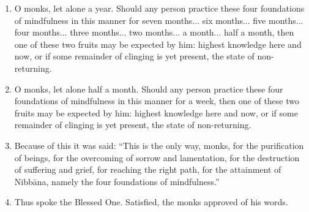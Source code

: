 \begin{enumerate}[resume]
\item O monks, let alone a year. Should any person practice these four foundations of mindfulness in this manner for seven months... six months... five months... four months... three months... two months... a month... half a month, then one of these two fruits may be expected by him: highest knowledge here and now, or if some remainder of clinging is yet present, the state of non-returning.
\item O monks, let alone half a month. Should any person practice these four foundations of mindfulness in this manner for a week, then one of these two fruits may be expected by him: highest knowledge here and now, or if some remainder of clinging is yet present, the state of non-returning.
\item Because of this it was said: “This is the only way, monks, for the purification of beings, for the overcoming of sorrow and lamentation, for the destruction of suffering and grief, for reaching the right path, for the attainment of Nibbāna, namely the four foundations of mindfulness.”
\item Thus spoke the Blessed One. Satisfied, the monks approved of his words.

\end{enumerate}